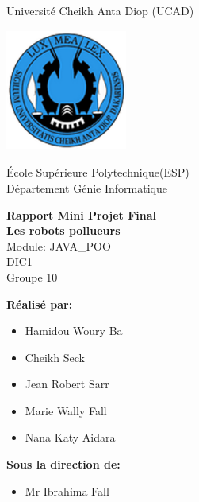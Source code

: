 \documentclass[12pt , a4paper]{report}
\begin{document}
	\begin{center}
		\normalsize{Université Cheikh Anta Diop (UCAD)}\\
		\begin{center}
			\includegraphics[width=4cm,height=4cm]{Logo_ucad_2.png}
		\end{center}
		\normalsize{École Supérieure Polytechnique(ESP)}\\
		\normalsize{Département Génie Informatique}\\
	\end{center}
	
	\begin{center}
		\Huge{\textbf{Rapport Mini Projet Final}}\\
		\vspace{0.7cm}
		\LARGE{\textbf{Les robots pollueurs}}\\
		\vspace{0.7cm}
		\large{Module: JAVA\_POO}\\
		\vspace{0.2cm}
		\large{DIC1}\\
		\vspace{0.2cm}
		\large{Groupe 10}\\
	\end{center}

	\begin{multicols}{2}
		\textbf{Réalisé par:}
		\begin{itemize}
			\item Hamidou Woury Ba
			\item Cheikh Seck
			\item Jean Robert Sarr
			\item Marie Wally Fall
			\item Nana Katy Aidara
		\end{itemize}
		\columnbreak
		\textbf{Sous la direction de:}
		\begin{itemize}
			\item Mr Ibrahima Fall
		\end{itemize}
	\end{multicols}
	\begin{center}
	\end{center}
	
\end{document}
